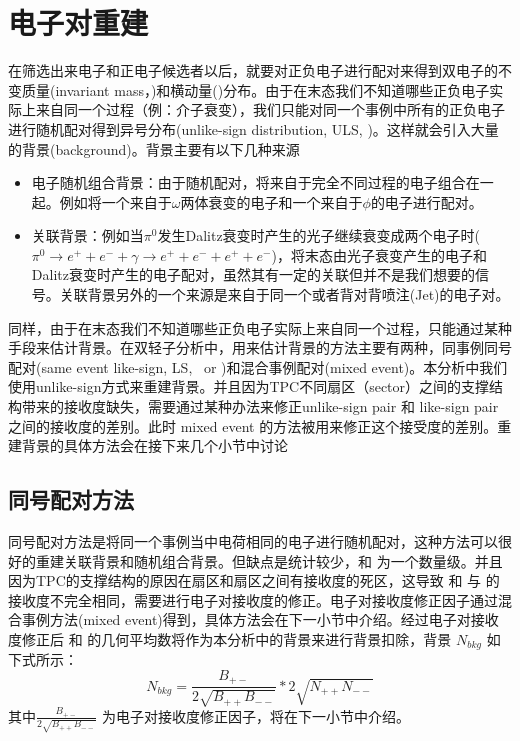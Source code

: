 \section{电子对重建}
在筛选出来电子和正电子候选者以后，就要对正负电子进行配对来得到双电子的不变质量(invariant mass，\Mee)和横动量(\pt)分布。由于在末态我们不知道哪些正负电子实际上来自同一个过程（例：介子衰变），我们只能对同一个事例中所有的正负电子进行随机配对得到异号分布(unlike-sign distribution, ULS, \Npm)。这样就会引入大量的背景(background)。背景主要有以下几种来源
\begin{itemize}
  \item 电子随机组合背景：由于随机配对，将来自于完全不同过程的电子组合在一起。例如将一个来自于$\omega$两体衰变的电子和一个来自于$\phi$的电子进行配对。
  \item 关联背景：例如当$\pi^0$发生Dalitz衰变时产生的光子继续衰变成两个电子时($\pi^0\rightarrow e^+ + e^- + \gamma \rightarrow e^+ + e^- + e^+ + e^- $)，将末态由光子衰变产生的电子和Dalitz衰变时产生的电子配对，虽然其有一定的关联但并不是我们想要的信号。关联背景另外的一个来源是来自于同一个或者背对背喷注(Jet)的电子对。
\end{itemize}

同样，由于在末态我们不知道哪些正负电子实际上来自同一个过程，只能通过某种手段来估计背景。在双轻子分析中，用来估计背景的方法主要有两种，同事例同号配对(same event like-sign, LS, \Npp~or \Nmm)和混合事例配对(mixed event)。本分析中我们使用unlike-sign方式来重建背景。并且因为TPC不同扇区（sector）之间的支撑结构带来的接收度缺失，需要通过某种办法来修正unlike-sign pair 和 like-sign pair 之间的接收度的差别。此时 mixed event 的方法被用来修正这个接受度的差别。重建背景的具体方法会在接下来几个小节中讨论
\subsection{同号配对方法}
同号配对方法是将同一个事例当中电荷相同的电子进行随机配对，这种方法可以很好的重建关联背景和随机组合背景。但缺点是统计较少，和 \Npm 为一个数量级。并且因为TPC的支撑结构的原因在扇区和扇区之间有接收度的死区，这导致 \Nmm 和 \Npp 与 \Npm 的接收度不完全相同，需要进行电子对接收度的修正。电子对接收度修正因子通过混合事例方法(mixed event)得到，具体方法会在下一小节中介绍。经过电子对接收度修正后 \Npp 和 \Nmm 的几何平均数将作为本分析中的背景来进行背景扣除，背景 $N_{bkg}$ 如下式所示：
\begin{equation}
    N_{bkg} = \frac{B_{+-}}{2\sqrt{B_{++}B_{--}}}*2\sqrt{N_{++}N_{--}}
\end{equation}
其中$\frac{B_{+-}}{2\sqrt{B_{++}B_{--}}}$ 为电子对接收度修正因子，将在下一小节中介绍。

